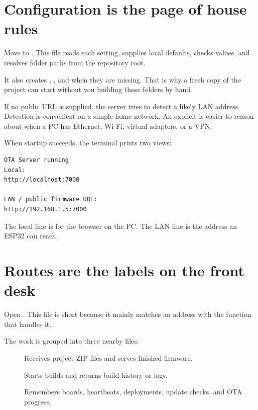 \section{Configuration is the page of house rules}

Move to . This file reads each  setting, supplies local defaults, checks values, and resolves folder paths from the repository root.

It also creates , , and  when they are missing. That is why a fresh copy of the project can start without you building those folders by hand.

If no public URL is supplied, the server tries to detect a likely LAN address. Detection is convenient on a simple home network. An explicit  is easier to reason about when a PC has Ethernet, Wi-Fi, virtual adapters, or a VPN.

When startup succeeds, the terminal prints two views:

\begin{lstlisting}[numbers=none]
OTA Server running
Local:
http://localhost:7000

LAN / public firmware URL:
http://192.168.1.5:7000
\end{lstlisting}

The local line is for the browser on the PC. The LAN line is the address an ESP32 can reach.

\section{Routes are the labels on the front desk}

Open . This file is short because it mainly matches an address with the function that handles it.

The work is grouped into three nearby files:

\begin{description}
  \item[] Receives project ZIP files and serves finished firmware.
  \item[] Starts builds and returns build history or logs.
  \item[] Remembers boards, heartbeats, deployments, update checks, and OTA progress.
\end{description}

